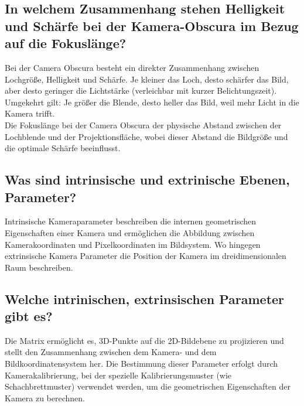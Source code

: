 \subsection{In welchem Zusammenhang stehen Helligkeit und Schärfe bei der Kamera-Obscura im Bezug auf die Fokuslänge?}
Bei der Camera Obscura besteht ein direkter Zusammenhang zwischen Lochgröße, Helligkeit und Schärfe. Je kleiner das Loch, 
desto schärfer das Bild, aber desto geringer die Lichtstärke (verleichbar mit kurzer Belichtungszeit). Umgekehrt gilt: Je größer die 
Blende, desto heller das Bild, weil mehr Licht in die Kamera trifft.\\

\noindent
Die Fokuslänge bei der Camera Obscura der physische Abstand zwischen der Lochblende und der Projektionsfläche, wobei dieser
Abstand die Bildgröße und die optimale Schärfe beeinflusst.


\subsection{Was sind intrinsische und extrinische Ebenen, Parameter?}
Intrinsische Kameraparameter beschreiben die internen geometrischen Eigenschaften einer Kamera und ermöglichen die Abbildung zwischen 
Kamerakoordinaten und Pixelkoordinaten im Bildsystem. Wo hingegen extrinsische Kamera Parameter die Position der Kamera
im dreidimensionalen Raum beschreiben.

\subsection{Welche intrinischen, extrinsischen Parameter gibt es?}
Die Matrix ermöglicht es, 3D-Punkte auf die 2D-Bildebene zu projizieren und stellt den Zusammenhang zwischen dem Kamera- und dem 
Bildkoordinatensystem her. Die Bestimmung dieser Parameter erfolgt durch Kamerakalibrierung, bei der spezielle Kalibrierungsmuster 
(wie Schachbrettmuster) verwendet werden, um die geometrischen Eigenschaften der Kamera zu berechnen.\\


